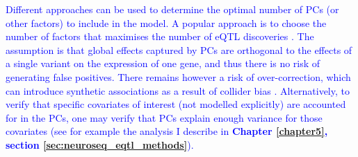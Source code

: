 \textcolor{blue}{Different approaches can be used to determine the optimal number of PCs (or other factors) to include in the model.
A popular approach is to choose the number of factors that maximises the number of eQTL discoveries \cite{westra2014genome, gtex2017genetic, aguet2019gtex}.
The assumption is that global effects captured by PCs are orthogonal to the effects of a single variant on the expression of one gene, and thus there is no risk of generating false positives. 
There remains however a risk of over-correction, which can introduce synthetic associations as a result of collider bias \cite{aschard2017covariate}.
Alternatively, 
to verify that specific covariates of interest (not modelled explicitly) are accounted for in the PCs, one may verify that PCs explain enough variance for those covariates (see for example the analysis I describe in \textbf{Chapter \ref{chapter5}, section \ref{sec:neuroseq_eqtl_methods}}).}


